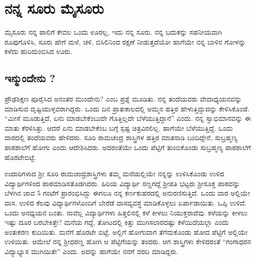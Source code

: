 {\fontsize{14}{16}\selectfont
\chapter{ನನ್ನ ಸೂರು ಮೈಸೂರು}



ಮೈಸೂರು ನನ್ನ ಪಾಲಿಗೆ ಕೇವಲ ಒಂದು ಊರಲ್ಲ, ಇದು ನನ್ನ ಸೂರು.  ನನ್ನ ಬದುಕನ್ನು ಸಹನೀಯವಾಗಿ ರೂಪುಗೊಳಿಸಿ, ಸೂರು ಹೇಗೆ ಮಳೆ, ಚಳಿ, ಬಿಸಿಲಿನಿಂದ ರಕ್ಷಣೆ ನೀಡುತ್ತದೆಯೋ ಹಾಗೆಯೇ ನನ್ನ ಬಾಳಿನ ಗೋಳನ್ನು ಕಳೆದು ಹುರಿದುಂಬಿಸಿದ ಊರು.

\section*{ಇನ್ಮುಂದೇನು ?} 

ಪ್ರೌಢಶಿಕ್ಷಣ ಪೂರೈಸಿದ ಅನಂತರ ಮುಂದೇನು? ಎಂಬ ಪ್ರಶ್ನೆ ಮೂಡಿತು.  ನನ್ನ ತಂದೆಯವರು ವೇದಾಧ್ಯಯನವನ್ನು ಮಾಡಿಸುವ ದೃಷ್ಟಿಯುಳ್ಳವರಾಗಿದ್ದರು.  ಒಂದು ದಿನ ಪ್ರಾತಃಕಾಲದಲ್ಲಿ ಅಮ್ಮನ ಹತ್ತಿರ ಹೇಳುತ್ತಿದ್ದುದನ್ನು ಕೇಳಿಸಿಕೊಂಡೆ.  “ಮೀಸೆ ಮೂಡುತ್ತಿದೆ, ಏನು ಮಾಡಬೇಕೆಂಬುದೇ ಗೊತ್ತಿಲ್ಲದೇ ಬೆಳೆಯುತ್ತಿದ್ದಾನೆ” ಎಂದು.   ನನ್ನ ಸ್ವಾಭಿಮಾನವನ್ನು ಈ ಮಾತು ಕೆರಳಿಸಿತ್ತು.  ಆದರೆ ಏನು ಮಾಡಬೇಕೆಂಬ ಬಗ್ಗೆ ಸ್ಪಷ್ಟ ಚಿತ್ರವಿರಲಿಲ್ಲ.  ಹಾಗೆಯೇ ಬೆಳೆಯುತ್ತಿದ್ದೆ.  ಒಂದು ವಾರದಲ್ಲಿ ತಂದೆಯವರು ಹೇಳಿದರು.  ಸೂರಿ ರಾಮಚಂದ್ರ ಶಾಸ್ತ್ರಿಗಳ ಹತ್ತಿರ ಮಾತನಾಡಿ ಬಂದಿದ್ದೇನೆ, ಸುಬ್ರಹ್ಮಣ್ಯ ಪಾಠಶಾಲೆಗೆ ಹೋಗು ಎಂದು ಆದೇಶಿಸಿದರು. ಅದರಂತೆಯೇ ಒಂದು ಪೆಟ್ಟಿಗೆ ತುಂಬಿಕೊಂಡು ಸುಬ್ರಹ್ಮಣ್ಯ ಪಾಠಶಾಲೆಗೆ ಹೊರಟೇಬಿಟ್ಟೆ.  

ಉದಾರಿಗಳಾದ ಶ್ರೀ ಸೂರಿ ರಾಮಚಂದ್ರಶಾಸ್ತ್ರಿಗಳು ತಮ್ಮ ಮನೆಯಲ್ಲಿಯೇ ನನ್ನನ್ನು ಉಳಿಸಿಕೊಂಡು ಉಳಿದ ವಿದ್ಯಾರ್ಥಿಗಳಿಂದ ಪಾಠಮಾಡಿಸತೊಡಗಿದರು.  ಹಿರಿಯ ವಿದ್ಯಾರ್ಥಿ ಸಣ್ಣಗದ್ದೆ ಶ್ರೀಪತಿ ಭಟ್ಟರು ಶ್ರೀಸೂಕ್ತ ಪಾಠವನ್ನು ಬೆಳಗಿನ ಜಾವ 5 ಗಂಟೆಗೆ ಪ್ರಾರಂಭಿಸಿದ್ದು ಈಗಲೂ ನನ್ನ ಕರ್ಣಕುಹರದಲ್ಲಿ  ಅನುರಣಿಸುತ್ತಿದೆ.  ಒಂದು ವಾರ ಅಲ್ಲಿಯೇ ವಾಸ.  ಉಳಿದ ಕೆಲವು ವಿದ್ಯಾರ್ಥಿಗಳೊಂದಿಗೆ ಬೇರೆಡೆ ವಾಸವ್ಯವಸ್ಥೆ ಮಾಡಿಕೊಳ್ಳಲು ಏರ್ಪಾಡಾಯಿತು.  ಒಪ್ಪಿ ಉಳಿದೆ.  ಒಂದು ಅನಧ್ಯಯನ ಬಂತು.  ನಾವೆಲ್ಲ ವಿದ್ಯಾರ್ಥಿಗಳು ಹಿತ್ತಲಿನಲ್ಲಿ ಕಳೆ ಕೀಳಲು ನಿಯುಕ್ತರಾದೆವು.  ಕಳೆಯನ್ನು ಕೀಳಲು ಇಷ್ಟು ದೂರ ಬರಬೇಕಿತ್ತೇ? ಮನೆಯ ಗದ್ದೆ, ತೋಟದಲ್ಲಿ ಕಿತ್ತು ಮುಗಿಸಲಾರದಷ್ಟು ಕಳೆಯಿದೆಯಲ್ಲಾ ಎಂದು ಅಂತಃಕರಣ ಕುದಿಯಿತು.  ಮನೆಗೆ ಹೊರಟೇ ಬಿಟ್ಟೆ.  ಅಲ್ಲಿಗೆ ಹೋಗುವಾಗ ತೆಗೆದುಕೊಂಡು ಹೋದ ಪೆಟ್ಟಿಗೆ ಅಲ್ಲಿಯೇ ಉಳಿಯಿತು. ಆಮೇಲೆ ನನ್ನ ಶ್ರೀಧರಣ್ಣ ಹೋಗಿ ಆ ಪೆಟ್ಟಿಗೆಯನ್ನು ತಂದರು. ಆಗ ಶಾಸ್ತ್ರಿಗಳು ಕೇಳಿದರಂತೆ  “ಗಂಗಾಧರನ ವಿದ್ಯಾಭ್ಯಾಸ ಮುಗಿಯಿತೇ” ಎಂದು. ಅದನ್ನು ಹಾಗೆಯೇ ನನಗೆ ವರದಿ ಮಾಡಿದ್ದರು. 

}
